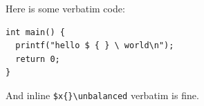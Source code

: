 \documentclass{article}
\begin{document}
Here is some verbatim code:
\begin{verbatim}
int main() {
  printf("hello $ { } \ world\n");
  return 0;
}
\end{verbatim}
And inline \verb|$x{}\unbalanced| verbatim is fine.
\end{document}
